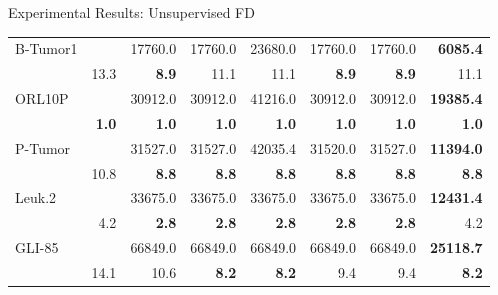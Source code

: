 \documentclass{beamer}
\begin{document}
\begin{frame}{Experimental Results: Unsupervised FD}
\begin{table} [t]
{\begin{tabular}{lr|r|r|r|r|r|r|}
	 \multicolumn{1}{|l|}{B-Tumor1}  &  & 17760.0 & 17760.0 & 23680.0 & 17760.0 & 17760.0 & \textbf{6085.4}  \\ \cline{2-8}
   \multicolumn{1}{|l|}{ }    & 13.3 & \textbf{8.9} & 11.1 & 11.1 & \textbf{8.9} & \textbf{8.9} & 11.1 \\ \hline

   \multicolumn{1}{|l|}{ORL10P}  &  & 30912.0 &   30912.0 & 41216.0 &  30912.0 & 30912.0 & \textbf{19385.4} \\ \cline{2-8}
   \multicolumn{1}{|l|}{ }    & \textbf{1.0} & \textbf{1.0} & \textbf{1.0} & \textbf{1.0} & \textbf{1.0} & \textbf{1.0} & \textbf{1.0}\\ \hline

	 \multicolumn{1}{|l|}{P-Tumor}  &  & 31527.0 & 31527.0 & 42035.4 & 31520.0 & 31527.0 & \textbf{11394.0}\\ \cline{2-8}
   \multicolumn{1}{|l|}{ }    & 10.8 & \textbf{8.8} & \textbf{8.8} & \textbf{8.8} & \textbf{8.8} & \textbf{8.8} & \textbf{8.8} \\ \hline

	 \multicolumn{1}{|l|}{Leuk.2}  &  & 33675.0 & 33675.0 & 33675.0 &33675.0 &33675.0 & \textbf{12431.4} \\ \cline{2-8}
   \multicolumn{1}{|l|}{ }  & 4.2 & \textbf{2.8} & \textbf{2.8} & \textbf{2.8} & \textbf{2.8} & \textbf{2.8} & 4.2  \\ \hline

   \multicolumn{1}{|l|}{GLI-85}  &  & 66849.0 & 66849.0 & 66849.0 & 66849.0 & 66849.0 & \textbf{25118.7}\\ \cline{2-8}
   \multicolumn{1}{|l|}{ }    & 14.1 & 10.6 & \textbf{8.2} & \textbf{8.2} & 9.4 & 9.4 & \textbf{8.2} \\ \hline
\end{tabular}}
\end{table}
\end{frame}


\end{document}
